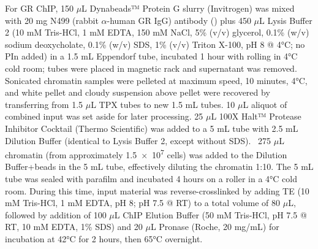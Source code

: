 \documentclass{article}
\begin{document}
{For GR ChIP, 150 $\mu$L Dynabeads™ Protein G slurry (Invitrogen) was mixed with 20 mg N499 (rabbit $\alpha$-human GR IgG) antibody (\cite{rogatsky_factor_2001}) plus 450 $\mu$L Lysis Buffer 2 (10 mM Tris-HCl, 1 mM EDTA, 150 mM NaCl, 5\% (v/v) glycerol, 0.1\% (w/v) sodium deoxycholate, 0.1\% (w/v) SDS, 1\% (v/v) Triton X-100, pH 8 @ 4°C; no PIn added) in a 1.5 mL Eppendorf tube, incubated 1 hour with rolling in 4°C cold room; tubes were placed in magnetic rack and supernatant was removed. Sonicated chromatin samples were pelleted at maximum speed, 10 minutes, 4°C, and white pellet and cloudy suspension above pellet were recovered by transferring from 1.5 $\mu$L TPX tubes to new 1.5 mL tubes. 10 $\mu$L aliquot of combined input was set aside for later processing. 25 $\mu$L 100X Halt™ Protease Inhibitor Cocktail (Thermo Scientific) was added to a 5 mL tube with 2.5 mL Dilution Buffer (identical to Lysis Buffer 2, except without SDS). ~275 $\mu$L chromatin (from approximately \num{1.5e7} cells) was added to the Dilution Buffer+beads in the 5 mL tube, effectively diluting the chromatin 1:10. The 5 mL tube was sealed with parafilm and incubated 4 hours on a roller in a 4°C cold room. During this time, input material was reverse-crosslinked by adding TE (10 mM Tris-HCl, 1 mM EDTA, pH 8; pH 7.5 @ RT) to a total volume of 80 $\mu$L, followed by addition of 100 $\mu$L ChIP Elution Buffer (50 mM Tris-HCl, pH 7.5 @ RT, 10 mM EDTA, 1\% SDS) and 20 $\mu$L Pronase (Roche, 20 mg/mL) for incubation at 42°C for 2 hours, then 65°C overnight.

}
\end{document}
